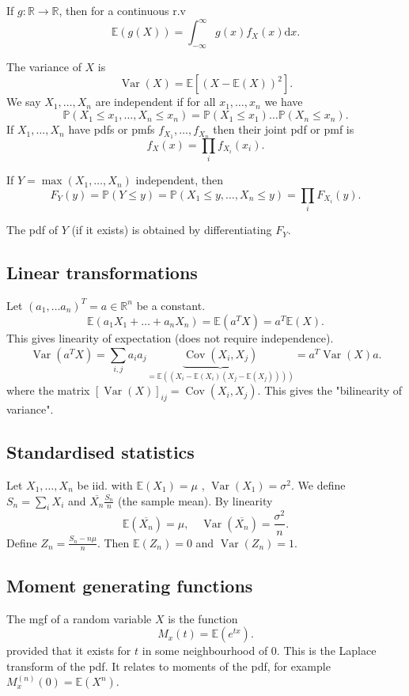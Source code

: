 \documentclass[a4paper]{scrartcl}
\begin{document}
If $g: \mathbb{R} \to \mathbb{R} $, then for a continuous r.v \[
\mathbb{E} (g (X))=\int_{-\infty }^{\infty} g (x) f_X (x)\mathrm{d}x
.\] 

The variance of $X$ is \[
\operatorname{Var} (X)= \mathbb{E} [(X-\mathbb{E}(X))^2]
.\] 
We say $X_1 , \ldots ,X_n$ are independent if for all $x_1 , \ldots , x_n$ we have \[
\mathbb{P} (X_1 \leq x_1 , \ldots ,X_n \leq x_n )=\mathbb{P}(X_1 \leq x_1) \ldots \mathbb{P}(X_n \leq x_n)
.\] 
If $X_1 , \ldots ,X_n $ have pdfs or pmfs $f_{X_1 }, \ldots,f_{X_n } $ then their joint pdf or pmf is \[
f_X (x)=\prod_{i}f_{X_i}(x_i)
.\] 

If $Y=\max (X_1 , \ldots ,X_n)$ independent, then \[
F_Y (y)=\mathbb{P} (Y \leq y)=\mathbb{P} (X_1 \leq y , \ldots ,X_n \leq y )=\prod_{i}F_{X_i}(y)
.\] 

The pdf of $Y$ (if it exists) is obtained by differentiating $F_Y$.
\subsection{Linear transformations}
Let $(a_1 , \ldots a_n)^T=a \in \mathbb{R}^{n}$ be a constant. \[
\mathbb{E} (a_1 X_1 +\ldots +a_n X_n)=\mathbb{E}(a^{T}X)=a^{T}\mathbb{E}(X)
.\]
This gives linearity of expectation (does not require independence). 
\[
\operatorname{Var}(a^{T}X)=\sum_{i,j}^{}a_{i}a_{j}\underbrace{\operatorname{Cov}(X_{i}, X_{j})}_{=\mathbb{E}((X_{i}-\mathbb{E}(X_{i})(X_{j}-\mathbb{E}(X_{j}))))} =a^{T}\operatorname{Var}(X)a
.\] 
where the matrix $[\operatorname{Var}(X)]_{ij}=\operatorname{Cov}(X_{i},X_{j})$. This gives the "bilinearity of variance".
\subsection{Standardised statistics}
Let $X_1 , \ldots , X_n$ be iid. with $\mathbb{E}(X_1 )=\mu$ , $\operatorname{Var}(X_1)=\sigma^2$. We define $S_n=\sum_{i}^{}X_{i}$ and $\overline{X_n} \frac{S_n}{n} $ (the sample mean). By linearity \[
\mathbb{E} (\overline{X_n} )=\mu, \quad \operatorname{Var }(\overline{X_n} )= \frac{\sigma^2}{n}
.\]   
Define $Z_{n}= \frac{S_{n}-n \mu}{n}$. Then $\mathbb{E}(Z_{n})=0$ and $\operatorname{Var}(Z_{n})=1$. 

\subsection{Moment generating functions}
The mgf of a random variable $X$ is the function \[
M_{x}(t)=\mathbb{E}(e^{tx})
.\] 
provided that it exists for $t$ in some neighbourhood of 0. This is the Laplace transform of the pdf. It relates to moments of the pdf, for example $M_{x}^{(n)}(0)=\mathbb{E} (X^{n})$. 
\end{document}

